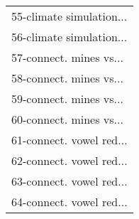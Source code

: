 \begin{table}[h]
\begin{center}
\begin{tabular}{l}
55-climate simulation... &  \\
56-climate simulation... &  \\
57-connect. mines vs... &  \\
58-connect. mines vs... &  \\
59-connect. mines vs... &  \\
60-connect. mines vs... &  \\ \hline
61-connect. vowel red... &  \\
62-connect. vowel red... &  \\
63-connect. vowel red... &  \\
64-connect. vowel red... &  \\\end{tabular}\label{stratsALCKappa1AllReduxhalfb}
\end{center}
\end{table}
